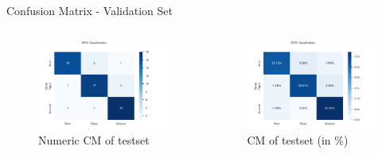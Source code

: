 \documentclass[aspectratio=169]{beamer}
\begin{document}
{	\begin{frame}{Confusion Matrix - Validation Set}
		\begin{columns}
			\begin{column}{.5\textwidth}
				\begin{figure}
					\centering
					\includegraphics[width=1\textwidth]{img/CFM_final_validation_numeric.png}
					\caption{Numeric CM of testset}
				\end{figure}      
			\end{column}
			\begin{column}{.5\textwidth}
				\begin{figure}
					\centering
					\includegraphics[width=1\textwidth]{img/CFM_final_validation_percent.png}
					\caption{CM of testset (in \%)}
				\end{figure}      
			\end{column} 
		\end{columns}
	\end{frame}
	
}
\end{document}
